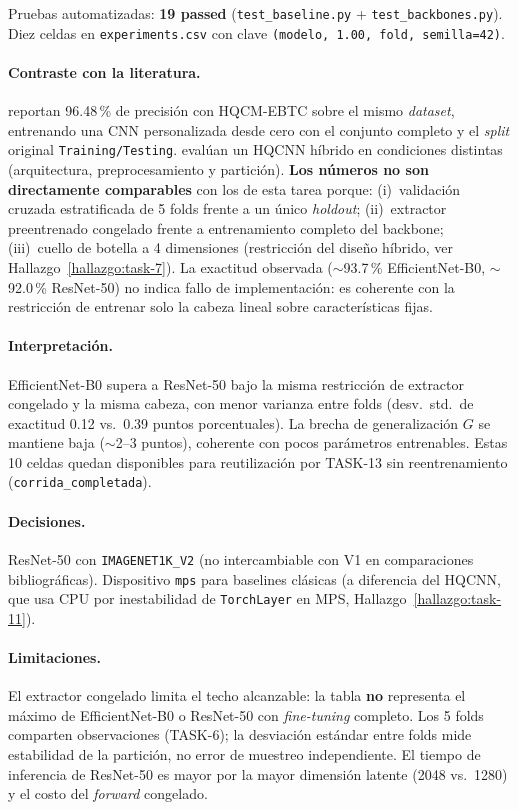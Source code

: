 Pruebas automatizadas: \textbf{19 passed} (\texttt{test\_baseline.py} + \texttt{test\_backbones.py}).
Diez celdas en \texttt{experiments.csv} con clave \texttt{(modelo, 1.00, fold, semilla=42)}.

\paragraph{Contraste con la literatura.}
\citet{haddou2025hqcm} reportan 96.48\,\% de precisión con HQCM-EBTC sobre el mismo
\textit{dataset}, entrenando una CNN personalizada desde cero con el conjunto completo y el
\textit{split} original \texttt{Training/Testing}. \citet{khan2024brain} evalúan un HQCNN
híbrido en condiciones distintas (arquitectura, preprocesamiento y partición).
\textbf{Los números no son directamente comparables} con los de esta tarea porque:
(i)~validación cruzada estratificada de 5 folds frente a un único \textit{holdout};
(ii)~extractor preentrenado congelado frente a entrenamiento completo del backbone;
(iii)~cuello de botella a 4 dimensiones (restricción del diseño híbrido, ver
Hallazgo~\ref{hallazgo:task-7}). La exactitud observada ($\sim$93.7\,\% EfficientNet-B0,
$\sim$92.0\,\% ResNet-50) no indica fallo de implementación: es coherente con la restricción
de entrenar solo la cabeza lineal sobre características fijas.

\paragraph{Interpretación.}
EfficientNet-B0 supera a ResNet-50 bajo la misma restricción de extractor congelado y la
misma cabeza, con menor varianza entre folds (desv.\ std.\ de exactitud 0.12 vs.\ 0.39 puntos
porcentuales). La brecha de generalización $G$ se mantiene baja ($\sim$2--3 puntos),
coherente con pocos parámetros entrenables. Estas 10 celdas quedan disponibles para
reutilización por TASK-13 sin reentrenamiento (\texttt{corrida\_completada}).

\paragraph{Decisiones.}
ResNet-50 con \texttt{IMAGENET1K\_V2} (no intercambiable con V1 en comparaciones
bibliográficas). Dispositivo \texttt{mps} para baselines clásicas (a diferencia del HQCNN,
que usa CPU por inestabilidad de \texttt{TorchLayer} en MPS, Hallazgo~\ref{hallazgo:task-11}).

\paragraph{Limitaciones.}
El extractor congelado limita el techo alcanzable: la tabla \textbf{no} representa el máximo
de EfficientNet-B0 o ResNet-50 con \textit{fine-tuning} completo. Los 5 folds comparten
observaciones (TASK-6); la desviación estándar entre folds mide estabilidad de la partición,
no error de muestreo independiente. El tiempo de inferencia de ResNet-50 es mayor por la
mayor dimensión latente (2048 vs.\ 1280) y el costo del \textit{forward} congelado.

